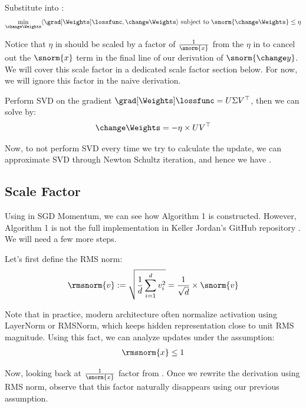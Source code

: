 \documentclass[12pt]{article}
\begin{document}
Substitute into :
\begin{align}
    \min_{\change \Weights} \langle \grad[\Weights]\lossfunc, \change \Weights \rangle \text{ subject to } \snorm{\change \Weights} \le \eta \label{muon-final}
\end{align}

Notice that $\eta$ in  should be scaled by a factor of $\frac{1}{\snorm{x}}$ from the $\eta$ in  to cancel out the $\snorm{x}$ term in the final line of our derivation of $\snorm{\change y}$. We will cover this scale factor in a dedicated scale factor section below. For now, we will ignore this factor in the naive derivation.  

Perform SVD on the gradient $\grad[\Weights]\lossfunc = U\Sigma V^\top$, then we can solve  by:
\begin{align}
    \change \Weights = -\eta \times UV^\top
\end{align}

Now, to not perform SVD every time we try to calculate the update, we can approximate SVD through Newton Schultz iteration, and hence we have . 

\subsection{Scale Factor}

Using  in SGD Momentum, we can see how Algorithm 1 is constructed. However, Algorithm 1 is not the full implementation in Keller Jordan's GitHub repository \cite{jordan2024muon}. We will need a few more steps. 

Let's first define the RMS norm:
\begin{align}
    \rmsnorm{v} := \sqrt{\frac{1}{d} \sum^{d}_{i=1} v^2_i} = \frac{1}{\sqrt{d}} \times \snorm{v}
\end{align}

Note that in practice, modern architecture often normalize activation using LayerNorm or RMSNorm, which keeps hidden representation close to unit RMS magnitude. Using this fact, we can analyze updates under the assumption:
\begin{align*}
    \rmsnorm{x} \le 1
\end{align*}

Now, looking back at $\frac{1}{\snorm{x}}$ factor from . Once we rewrite the derivation using RMS norm, observe that this factor naturally disappears using our previous assumption. 
\end{document}
